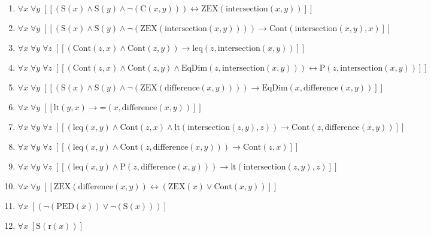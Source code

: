 \documentclass{article}
\begin{document}
\begin{enumerate}
\item $\forall x\; \forall y\;  \left[ \left[ \left(\textrm{S}(x) \land \textrm{S}(y) \land \neg \left(\textrm{C}(x,y)\right)\right) \leftrightarrow \textrm{ZEX}(\textrm{intersection}(x,y)) \right] \right]$
\item $\forall x\; \forall y\;  \left[ \left[ \left(\textrm{S}(x) \land \textrm{S}(y) \land \neg \left(\textrm{ZEX}(\textrm{intersection}(x,y))\right)\right) \rightarrow \textrm{Cont}(\textrm{intersection}(x,y),x) \right] \right]$
\item $\forall x\; \forall y\; \forall z\;  \left[ \left[ \left(\textrm{Cont}(z,x) \land \textrm{Cont}(z,y)\right) \rightarrow \textrm{leq}(z,\textrm{intersection}(x,y)) \right] \right]$
\item $\forall x\; \forall y\; \forall z\;  \left[ \left[ \left(\textrm{Cont}(z,x) \land \textrm{Cont}(z,y) \land \textrm{EqDim}(z,\textrm{intersection}(x,y))\right) \leftrightarrow \textrm{P}(z,\textrm{intersection}(x,y)) \right] \right]$
\item $\forall x\; \forall y\;  \left[ \left[ \left(\textrm{S}(x) \land \textrm{S}(y) \land \neg \left(\textrm{ZEX}(\textrm{difference}(x,y))\right)\right) \rightarrow \textrm{EqDim}(x,\textrm{difference}(x,y)) \right] \right]$
\item $\forall x\; \forall y\;  \left[ \left[ \textrm{lt}(y,x) \rightarrow \textrm{=}(x,\textrm{difference}(x,y)) \right] \right]$
\item $\forall x\; \forall y\; \forall z\;  \left[ \left[ \left(\textrm{leq}(x,y) \land \textrm{Cont}(z,x) \land \textrm{lt}(\textrm{intersection}(z,y),z)\right) \rightarrow \textrm{Cont}(z,\textrm{difference}(x,y)) \right] \right]$
\item $\forall x\; \forall y\; \forall z\;  \left[ \left[ \left(\textrm{leq}(x,y) \land \textrm{Cont}(z,\textrm{difference}(x,y))\right) \rightarrow \textrm{Cont}(z,x) \right] \right]$
\item $\forall x\; \forall y\; \forall z\;  \left[ \left[ \left(\textrm{leq}(x,y) \land \textrm{P}(z,\textrm{difference}(x,y))\right) \rightarrow \textrm{lt}(\textrm{intersection}(z,y),z) \right] \right]$
\item $\forall x\; \forall y\;  \left[ \left[ \textrm{ZEX}(\textrm{difference}(x,y)) \leftrightarrow \left(\textrm{ZEX}(x) \lor \textrm{Cont}(x,y)\right) \right] \right]$
\item $\forall x\;  \left[ \left(\neg \left(\textrm{PED}(x)\right) \lor \neg \left(\textrm{S}(x)\right)\right) \right]$
\item $\forall x\;  \left[ \textrm{S}(\textrm{r}(x)) \right]$

\end{enumerate}
\end{document}
